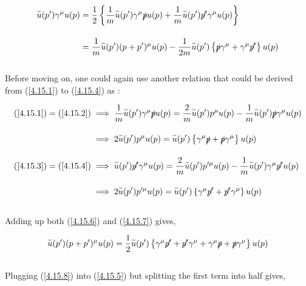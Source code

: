 \begin{solution}
\begin{align}
    \overbar{u}(p')\gamma^\mu u(p) &= \frac{1}{2} \left\{ \frac{1}{m}  \overbar{u}(p')\gamma^\mu \slashed{p} u(p)  + \frac{1}{m}  \overbar{u}(p')  \slashed{p'} \gamma^\mu u(p) \right\} \nonumber \\[0.15in]
                                   &= \frac{1}{m}   \overbar{u}(p') (p+p')^\mu  u(p)  - \frac{1}{2m} \overbar{u}(p') \left\{ \slashed{p}\gamma^\mu + \gamma^\mu \slashed{p'} \right\}  u(p) \label{4.15.5}
\end{align}\\
Before moving on, one could again use another relation that could be derived from (\ref{4.15.1}) to (\ref{4.15.4}) as :

\begin{align}
    (\ref{4.15.1}) = (\ref{4.15.2}) &\implies \frac{1}{m}  \overbar{u}(p')\gamma^\mu \slashed{p} u(p) = \frac{2}{m}  \overbar{u}(p') p^\mu  u(p) - \frac{1}{m}  \overbar{u}(p') \slashed{p} \gamma^\mu   u(p) \nonumber \\[0.15in]
                                    &\implies 2 \overbar{u}(p') p^\mu  u(p) = \overbar{u}(p') \left\{ \gamma^\mu \slashed{p} + \slashed{p}\gamma^\mu \right\} u(p)  \label{4.15.6} \\[0.15in]
    (\ref{4.15.3}) = (\ref{4.15.4}) &\implies  \overbar{u}(p')  \slashed{p'} \gamma^\mu u(p)  = \frac{2}{m}  \overbar{u}(p') p'^\mu  u(p) - \frac{1}{m}  \overbar{u}(p') \gamma^\mu   \slashed{p'} u(p)    \nonumber \\[0.15in]
                                    &\implies 2 \overbar{u}(p') p'^\mu  u(p) = \overbar{u}(p') \left\{ \gamma^\mu \slashed{p'} + \slashed{p'}\gamma^\mu \right\} u(p)   \label{4.15.7}
\end{align}\\
Adding up both (\ref{4.15.6}) and (\ref{4.15.7}) gives, 

\begin{align}
    \overbar{u}(p') (p+p')^\mu  u(p) = \frac{1}{2} \overbar{u}(p') \left\{ \gamma^\mu \slashed{p'} + \slashed{p'}\gamma^\mu + \gamma^\mu \slashed{p} + \slashed{p}\gamma^\mu \right\} u(p) \label{4.15.8}
\end{align}\\
Plugging (\ref{4.15.8}) into (\ref{4.15.5}) but splitting the first term into half gives, 


\end{solution}
